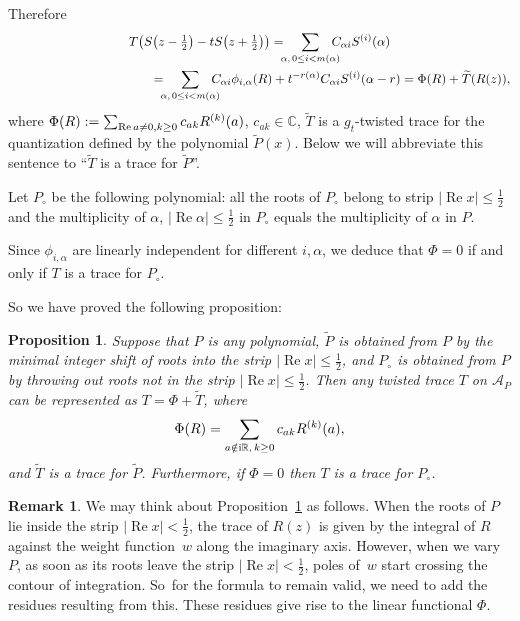 \documentclass[pdftex]{sigma}
\newcommand{\RN}{\mathbb{R}} %
\newcommand{\CN}{\mathbb{C}} %
\newcommand{\suml}{\sum\limits}
\renewcommand{\Re}{\operatorname{Re}}
\newtheorem{Proposition}[Theorem]{Proposition}
\theoremstyle{definition}
\newtheorem{Remark}[Theorem]{Remark}
\numberwithin{equation}{section}
\begin{document}
Therefore
\begin{gather*}
T\big(S\big(z-\tfrac{1}{2}\big)-tS\big(z+\tfrac{1}{2}\big)\big)=\!\!\!\sum_{\alpha,\,0\le i<m(\alpha)}\!\!\!\!\!C_{\alpha i} S^{(i)}(\alpha)
\\ \hphantom{T\big(S\big(z-\tfrac{1}{2}\big)-tS\big(z+\tfrac{1}{2}\big)\big)}
{}=\!\!\!\sum_{\alpha,\,0\le i<m(\alpha)}\!\!\!\!\!C_{\alpha i} \phi_{i,\alpha}(R)+t^{-r(\alpha)}C_{\alpha i} S^{(i)}(\alpha-r)=\Phi(R)+\widetilde{T}(R(z)),
\end{gather*}
where $\Phi(R):=\suml\nolimits_{\Re a\neq 0,k\ge 0}c_{ak} R^{(k)}(a)$, $c_{ak}\in \CN$, $\widetilde{T}$ is a $g_t$-twisted trace for the quantization defined by the polynomial $\widetilde{P}(x)$. Below we will abbreviate this sentence to ``$\widetilde{T}$ is a trace for $\widetilde{P}$''.

Let $P_\circ$ be the following polynomial: all the roots of $P_\circ$ belong to strip $|\Re x|\leq \frac{1}{2}$ and the multiplicity of $\alpha$, $|\Re\alpha|\leq \frac{1}{2}$ in $P_\circ$ equals the multiplicity of $\alpha$ in $P$.

Since $\phi_{i,\alpha}$ are linearly independent for different $i,\alpha$, we deduce that $\Phi=0$ if and only if $T$ is a trace for $P_\circ$.

So we have proved the following proposition:
\begin{Proposition}
\label{PropGeneralTrace}
Suppose that $P$ is any polynomial, $\widetilde{P}$ is obtained from $P$ by the minimal integer shift of roots into the strip $|\Re x|\leq \frac{1}{2}$, and $P_\circ$ is obtained from $P$ by throwing out roots not in the strip $|\Re x|\leq \frac{1}{2}$. Then any twisted trace $T$ on $\mathcal A_P$ can be represented as $T=\Phi+\widetilde{T}$, where
\[
\Phi(R)=\sum_{a\notin {\rm i}\RN,\,k\ge 0} c_{a k} R^{(k)}(a),
\]
and $\widetilde{T}$ is a trace for $\widetilde{P}$. Furthermore, if $\Phi=0$ then $T$ is a trace for $P_\circ$.
\end{Proposition}

\begin{Remark} We may think about Proposition~\ref{PropGeneralTrace} as follows.
When the roots of $P$ lie inside the strip $|\Re x|<\frac{1}{2}$, the trace of $R(z)$ is given by
the integral of $R$ against the weight function~$w$ along the imaginary axis.
However, when we vary~$P$, as soon as its roots leave the strip $|\Re x|<\frac{1}{2}$,
poles of~$w$ start crossing the contour of integration. So~for the formula to remain valid,
we need to add the residues resulting from this. These residues give rise to the linear functional $\Phi$.
\end{Remark}
\end{document}
